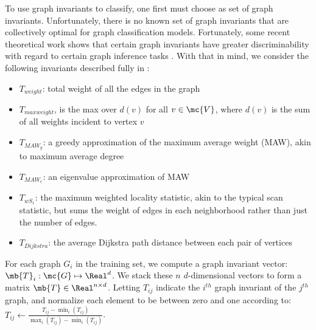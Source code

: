 \documentclass[10pt,journal,cspaper,compsoc]{IEEEtran}
\begin{document}
To use graph invariants to classify, one first must choose as set of graph invariants.  Unfortunately, there is no known set of graph invariants that are collectively optimal for graph classification models. Fortunately, some recent theoretical work shows that certain graph invariants have greater discriminability with regard to certain graph inference tasks \cite{Ruhkhin2011}. With that in mind, we consider the following invariants described fully in \cite{CPP11}:
\begin{itemize}
	\item $T_{weight}$: total weight of all the edges in the graph
	\item $T_{maxweight}$, is the max over $d(v)$ for all $v \in \mc{V}$, where $d(v)$ is the sum of all weights incident to vertex $v$	
	\item $T_{MAW_g}$: a greedy approximation of the maximum average weight (MAW), akin to maximum average degree
	\item $T_{MAW_e}$: an eigenvalue approximation of MAW
	\item $T_{wS_1}$: the maximum weighted locality statistic, akin to the typical scan statistic, but sums the weight of edges in each neighborhood rather than just the number of edges.
	\item $T_{Dijkstra}$: the average Dijkstra path distance between each pair of vertices
\end{itemize}
For each graph $G_i$ in the training set, we compute a graph invariant vector: $\mb{T}_i: \mc{G} \mapsto \Real^d$.  We stack these $n$ $d$-dimensional vectors to form a matrix $\mb{T} \in \Real^{n \times d}$.  Letting $T_{ij}$ indicate the $i^{th}$ graph invariant of the $j^{th}$ graph, and normalize each element to be between zero and one according to:  $T_{ij} \leftarrow \frac{T_{ij} - \min_i (T_{ij})}{\max_i(T_{ij}) - \min_i(T_{ij})}$.
\end{document}
